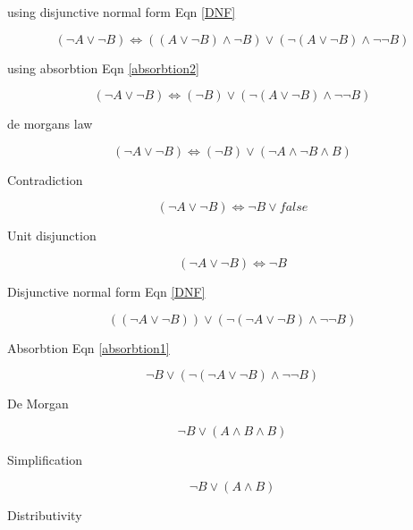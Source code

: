 \documentclass[10pt,a4paper]{article}
\begin{document}
using disjunctive normal form Eqn \ref{DNF}


\begin{equation}
(\neg A \vee \neg B )  \Leftrightarrow ((A \vee \neg B) \wedge \neg B) \vee (\neg(A\vee \neg B) \wedge \neg\neg B)
\end{equation}

using absorbtion Eqn \ref{absorbtion2}


\begin{equation}
(\neg A \vee \neg B )  \Leftrightarrow ( \neg B) \vee (\neg(A\vee \neg B) \wedge \neg\neg B)
\end{equation}

de morgans law

\begin{equation}
(\neg A \vee \neg B )  \Leftrightarrow ( \neg B) \vee (\neg A \wedge \neg B \wedge B)
\end{equation}

Contradiction

\begin{equation}
(\neg A \vee \neg B )  \Leftrightarrow \neg B \vee false
\end{equation}

Unit disjunction 

\begin{equation}
(\neg A \vee \neg B )  \Leftrightarrow \neg B
\end{equation}

Disjunctive normal form Eqn \ref{DNF}

\begin{equation}
((\neg A \vee \neg B)) \vee (\neg(\neg A \vee \neg B) \wedge \neg\neg B)
\end{equation}

Absorbtion Eqn \ref{absorbtion1}

\begin{equation}
 \neg B \vee  (\neg(\neg A \vee \neg B) \wedge \neg\neg B)
\end{equation}

De Morgan

\begin{equation}
 \neg B \vee  ( A \wedge B \wedge  B)
\end{equation}

Simplification 

\begin{equation}
 \neg B \vee  ( A \wedge B)
\end{equation}

Distributivity
\end{document}
